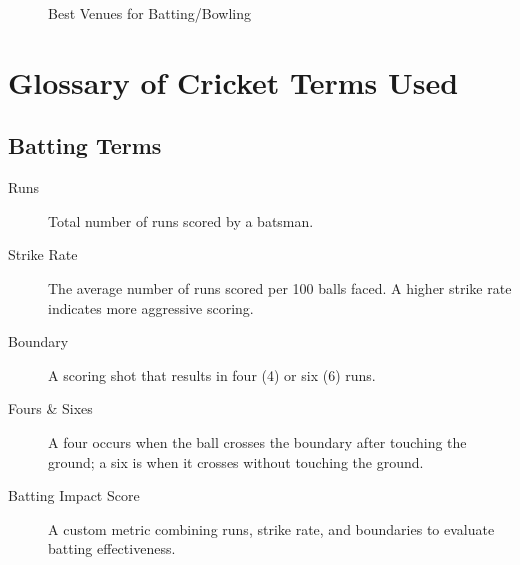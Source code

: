 \documentclass{article}[12pt]
\begin{document}
\begin{appendices}
\begin{figure}[!htb]
    \centering
    \qquad
    \caption{Best Venues for Batting/Bowling}%
    \label{fig:venues}%
\end{figure}
\clearpage
\section{Glossary of Cricket Terms Used}

\label{appendix:terms}

\subsection*{Batting Terms}
\begin{description}
  \item[Runs] Total number of runs scored by a batsman.
  \item[Strike Rate] The average number of runs scored per 100 balls faced. A higher strike rate indicates more aggressive scoring.
  \item[Boundary] A scoring shot that results in four (4) or six (6) runs.
  \item[Fours \& Sixes] A four occurs when the ball crosses the boundary after touching the ground; a six is when it crosses without touching the ground.
  \item[Batting Impact Score] A custom metric combining runs, strike rate, and boundaries to evaluate batting effectiveness.
\end{description}


\end{appendices}
\end{document}
